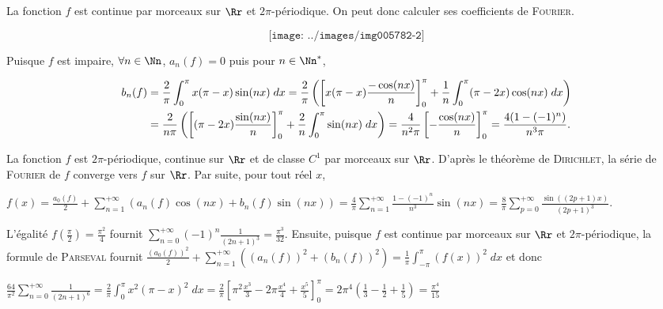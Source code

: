 {{\begin{center}
\end{center}
La fonction $f$ est continue par morceaux sur $\Rr$ et $2\pi$-périodique. On peut donc calculer ses coefficients de \textsc{Fourier}.

$$\texttt{[image: ../images/img005782-2]}$$



Puisque $f$ est impaire, $\forall n\in\Nn$, $a_n(f)=0$ puis pour $n\in\Nn^*$, 

\begin{align*}\ensuremath
b_n(f)&=\frac{2}{\pi}\int_{0}^{\pi}x(\pi-x)\sin(nx)\;dx=\frac{2}{\pi}\left(\left[x(\pi-x)\frac{-\cos(nx)}{n}\right]_0^\pi+\frac{1}{n}\int_{0}^{\pi}(\pi-2x)\cos(nx)\;dx\right)\\
 &=\frac{2}{n\pi}\left(\left[(\pi-2x)\frac{\sin(nx)}{n}\right]_0^\pi+\frac{2}{n}\int_{0}^{\pi}\sin(nx)\;dx\right)=\frac{4}{n^2\pi}\left[-\frac{\cos(nx)}{n}\right]_0^\pi=\frac{4(1-(-1)^n)}{n^3\pi}.
\end{align*} 

La fonction $f$ est $2\pi$-périodique, continue sur $\Rr$ et de classe $C^1$ par morceaux sur $\Rr$. D'après le théorème de \textsc{Dirichlet}, la série de \textsc{Fourier} de $f$ converge vers $f$ sur $\Rr$. Par suite, pour tout réel $x$, 

\begin{center}
$f(x)=\frac{a_0(f)}{2}+\sum_{n=1}^{+\infty}(a_n(f)\cos(nx)+b_n(f)\sin(nx))=\frac{4}{\pi}\sum_{n=1}^{+\infty}\frac{1-(-1)^n}{n^3}\sin(nx)=\frac{8}{\pi}\sum_{p=0}^{+\infty}\frac{\sin((2p+1)x)}{(2p+1)^3}$.
\end{center}

\begin{center}
\end{center}

L'égalité $f\left(\frac{\pi}{2}\right)=\frac{\pi^2}{4}$ fournit $\sum_{n=0}^{+\infty}(-1)^n\frac{1}{(2n+1)^3}=\frac{\pi^3}{32}$. Ensuite,  puisque $f$ est continue par morceaux sur $\Rr$ et $2\pi$-périodique, la formule de \textsc{Parseval} fournit $\frac{(a_0(f))^2}{2}+\sum_{n=1}^{+\infty}((a_n(f))^2+(b_n(f))^2)=\frac{1}{\pi}\int_{-\pi}^{\pi}(f(x))^2\;dx$ et donc

\begin{center}
$\frac{64}{\pi^2}\sum_{n=0}^{+\infty}\frac{1}{(2n+1)^6}=\frac{2}{\pi}\int_{0}^{\pi}x^2(\pi-x)^2\;dx=\frac{2}{\pi}\left[\pi^2\frac{x^3}{3}-2\pi\frac{x^4}{4}+\frac{x^5}{5}\right]_0^\pi=2\pi^4\left(\frac{1}{3}-\frac{1}{2}+\frac{1}{5}\right)=\frac{\pi^4}{15}$
\end{center}

}}
